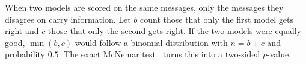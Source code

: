 When two models are scored on the same messages, only the messages they disagree on carry information. Let $b$ count those that only the first model gets right and $c$ those that only the second gets right. If the two models were equally good, $\min(b,c)$ would follow a binomial distribution with $n=b+c$ and probability $0.5$. The exact McNemar test~\cite{mcnemar1947note,dietterich1998approximate} turns this into a two-sided $p$-value.
